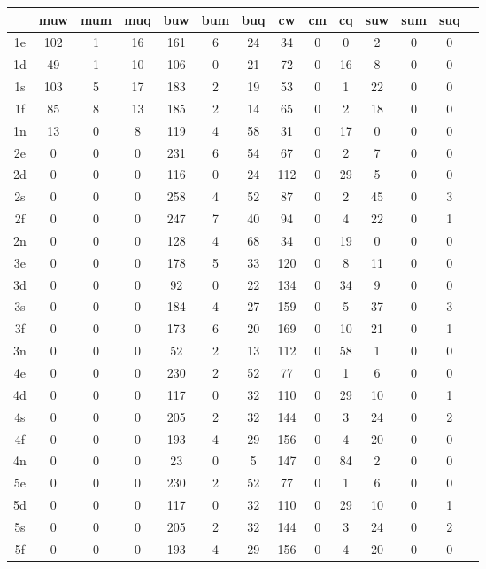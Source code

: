 \documentclass[a4paper,11pt]{article}
\begin{document}
\begin{table}[t]
	\begin{tabular}{c|c|c|c|c|c|c|c|c|c|c|c|c|c}
		& muw & mum & muq & buw & bum & buq & cw & cm & cq & suw & sum & suq \\
		\hline
		1e & 102 & 1 & 16 & 161 & 6 & 24 & 34 & 0 & 0 & 2 & 0 & 0\\
		1d & 49 & 1 & 10 & 106 & 0 & 21 & 72 & 0 & 16 & 8 & 0 & 0\\
		1s & 103 & 5 & 17 & 183 & 2 & 19 & 53 & 0 & 1 & 22 & 0 & 0\\
		1f & 85 & 8 & 13 & 185 & 2 & 14 & 65 & 0 & 2 & 18 & 0 & 0\\
		1n & 13 & 0 & 8 & 119 & 4 & 58 & 31 & 0 & 17 & 0 & 0 & 0\\
		2e & 0 & 0 & 0 & 231 & 6 & 54 & 67 & 0 & 2 & 7 & 0 & 0\\
		2d & 0 & 0 & 0 & 116 & 0 & 24 & 112 & 0 & 29 & 5 & 0 & 0\\
		2s & 0 & 0 & 0 & 258 & 4 & 52 & 87 & 0 & 2 & 45 & 0 & 3\\
		2f & 0 & 0 & 0 & 247 & 7 & 40 & 94 & 0 & 4 & 22 & 0 & 1\\
		2n & 0 & 0 & 0 & 128 & 4 & 68 & 34 & 0 & 19 & 0 & 0 & 0\\
		3e & 0 & 0 & 0 & 178 & 5 & 33 & 120 & 0 & 8 & 11 & 0 & 0\\
		3d & 0 & 0 & 0 & 92 & 0 & 22 & 134 & 0 & 34 & 9 & 0 & 0\\
		3s & 0 & 0 & 0 & 184 & 4 & 27 & 159 & 0 & 5 & 37 & 0 & 3\\
		3f & 0 & 0 & 0 & 173 & 6 & 20 & 169 & 0 & 10 & 21 & 0 & 1\\
		3n & 0 & 0 & 0 & 52 & 2 & 13 & 112 & 0 & 58 & 1 & 0 & 0\\
		4e & 0 & 0 & 0 & 230 & 2 & 52 & 77 & 0 & 1 & 6 & 0 & 0\\
		4d & 0 & 0 & 0 & 117 & 0 & 32 & 110 & 0 & 29 & 10 & 0 & 1\\
		4s & 0 & 0 & 0 & 205 & 2 & 32 & 144 & 0 & 3 & 24 & 0 & 2\\
		4f & 0 & 0 & 0 & 193 & 4 & 29 & 156 & 0 & 4 & 20 & 0 & 0\\
		4n & 0 & 0 & 0 & 23 & 0 & 5 & 147 & 0 & 84 & 2 & 0 & 0\\
		5e & 0 & 0 & 0 & 230 & 2 & 52 & 77 & 0 & 1 & 6 & 0 & 0\\
		5d & 0 & 0 & 0 & 117 & 0 & 32 & 110 & 0 & 29 & 10 & 0 & 1\\
		5s & 0 & 0 & 0 & 205 & 2 & 32 & 144 & 0 & 3 & 24 & 0 & 2\\
		5f & 0 & 0 & 0 & 193 & 4 & 29 & 156 & 0 & 4 & 20 & 0 & 0\\

\end{tabular}
\end{table}
\end{document}
